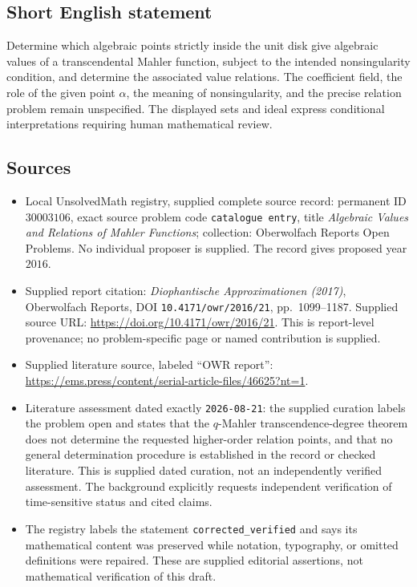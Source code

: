 \documentclass[11pt]{article}
\begin{document}
\subsection{Short English statement}
Determine which algebraic points strictly inside the unit disk give algebraic values of a transcendental Mahler function, subject to the intended nonsingularity condition, and determine the associated value relations. The coefficient field, the role of the given point \(\alpha\), the meaning of nonsingularity, and the precise relation problem remain unspecified. The displayed sets and ideal express conditional interpretations requiring human mathematical review.
\subsection{Sources}
\begin{itemize}
\item Local UnsolvedMath registry, supplied complete source record: permanent ID \(30003106\), exact source problem code \texttt{catalogue entry}, title \emph{Algebraic Values and Relations of Mahler Functions}; collection: Oberwolfach Reports Open Problems. No individual proposer is supplied. The record gives proposed year \(2016\).
\item Supplied report citation: \emph{Diophantische Approximationen (2017)}, Oberwolfach Reports, DOI \texttt{10.4171/owr/2016/21}, pp.~1099--1187. Supplied source URL: \url{https://doi.org/10.4171/owr/2016/21}. This is report-level provenance; no problem-specific page or named contribution is supplied.
\item Supplied literature source, labeled ``OWR report'': \url{https://ems.press/content/serial-article-files/46625?nt=1}.
\item Literature assessment dated exactly \texttt{2026-08-21}: the supplied curation labels the problem open and states that the \(q\)-Mahler transcendence-degree theorem does not determine the requested higher-order relation points, and that no general determination procedure is established in the record or checked literature. This is supplied dated curation, not an independently verified assessment. The background explicitly requests independent verification of time-sensitive status and cited claims.
\item The registry labels the statement \texttt{corrected\_verified} and says its mathematical content was preserved while notation, typography, or omitted definitions were repaired. These are supplied editorial assertions, not mathematical verification of this draft.
\end{itemize}
\end{document}
